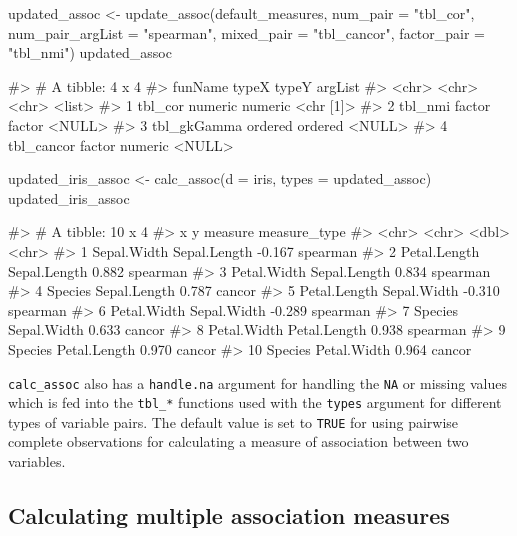 \begin{Schunk}
\begin{Sinput}
updated_assoc <- update_assoc(default_measures,
                              num_pair = "tbl_cor",
                              num_pair_argList = "spearman",
                              mixed_pair = "tbl_cancor",
                              factor_pair = "tbl_nmi")
updated_assoc
\end{Sinput}
\begin{Soutput}
#> # A tibble: 4 x 4
#>   funName     typeX   typeY   argList  
#>   <chr>       <chr>   <chr>   <list>   
#> 1 tbl_cor     numeric numeric <chr [1]>
#> 2 tbl_nmi     factor  factor  <NULL>   
#> 3 tbl_gkGamma ordered ordered <NULL>   
#> 4 tbl_cancor  factor  numeric <NULL>
\end{Soutput}
\end{Schunk}

\begin{Schunk}
\begin{Sinput}
updated_iris_assoc <- calc_assoc(d = iris, 
                                 types = updated_assoc)
updated_iris_assoc
\end{Sinput}
\begin{Soutput}
#> # A tibble: 10 x 4
#>    x            y            measure measure_type
#>    <chr>        <chr>          <dbl> <chr>       
#>  1 Sepal.Width  Sepal.Length  -0.167 spearman    
#>  2 Petal.Length Sepal.Length   0.882 spearman    
#>  3 Petal.Width  Sepal.Length   0.834 spearman    
#>  4 Species      Sepal.Length   0.787 cancor      
#>  5 Petal.Length Sepal.Width   -0.310 spearman    
#>  6 Petal.Width  Sepal.Width   -0.289 spearman    
#>  7 Species      Sepal.Width    0.633 cancor      
#>  8 Petal.Width  Petal.Length   0.938 spearman    
#>  9 Species      Petal.Length   0.970 cancor      
#> 10 Species      Petal.Width    0.964 cancor
\end{Soutput}
\end{Schunk}

\texttt{calc\_assoc} also has a \texttt{handle.na} argument for handling
the \texttt{NA} or missing values which is fed into the \texttt{tbl\_*}
functions used with the \texttt{types} argument for different types of
variable pairs. The default value is set to \texttt{TRUE} for using
pairwise complete observations for calculating a measure of association
between two variables.

\hypertarget{calculating-multiple-association-measures}{%
\subsection{Calculating multiple association
measures}\label{calculating-multiple-association-measures}}

